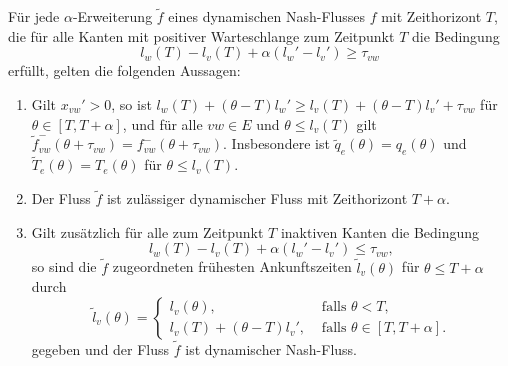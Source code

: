 \begin{theorem}\label{thm-alpha-extension-is-nash-flow}
	Für jede $\alpha$-Erweiterung $\tilde{f}$ eines dynamischen Nash-Flusses $f$ mit Zeithorizont $T$, die für alle Kanten mit positiver Warteschlange zum Zeitpunkt $T$ die Bedingung
	$$l_w(T) - l_v(T) + \alpha(l_w' - l_v') \geq \tau_{vw}$$
	erfüllt, gelten die folgenden Aussagen:
	\begin{enumerate}[label=(\roman*)]
		\item Gilt $x_{vw}' > 0$, so ist $l_w(T) + (\theta - T)l_w' \geq l_v(T) + (\theta - T)l_v' + \tau_{vw}$ für $\theta\in[T, T+\alpha]$, und für alle $vw\in E $ und $\theta \leq l_v(T)$ gilt  $\tilde{f}^-_{vw}(\theta + \tau_{vw})=f^-_{vw}(\theta + \tau_{vw})$.
		Insbesondere ist $\tilde{q}_e(\theta) = q_e(\theta)$ und $\tilde{T}_e(\theta) = T_e(\theta)$ für $\theta \leq l_v(T)$.
		\item Der Fluss $\tilde{f}$ ist zulässiger dynamischer Fluss mit Zeithorizont $T+\alpha$. 
		\item Gilt zusätzlich für alle zum Zeitpunkt $T$ inaktiven Kanten die Bedingung $$
		l_w(T) - l_v(T) + \alpha(l_w' -l_v') \leq \tau_{vw},
		$$
		so sind die $\tilde{f}$ zugeordneten frühesten Ankunftszeiten $\tilde{l}_v(\theta)$ für $\theta \leq T+\alpha$ durch
		$$\tilde{l}_v(\theta) = \begin{cases}
		l_v(\theta), & \text{ falls $\theta < T$,} \\
		l_v(T) + (\theta - T) l_v', & \text{ falls $\theta \in [T, T+\alpha]$.}
		\end{cases}$$
		gegeben und der Fluss $\tilde{f}$ ist dynamischer Nash-Fluss.
	\end{enumerate}
\end{theorem}
